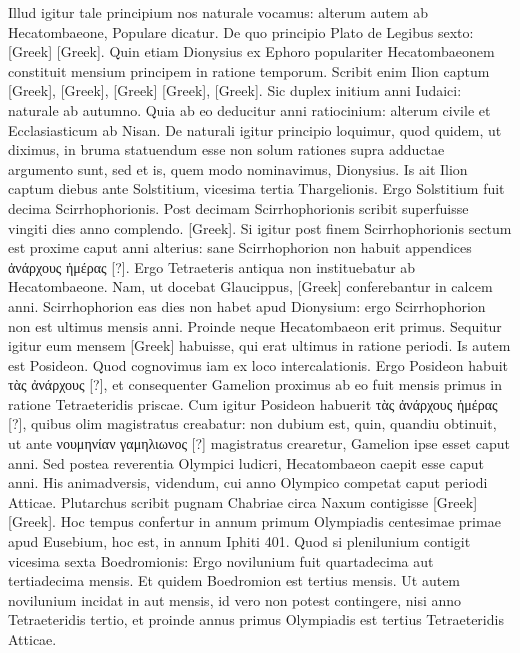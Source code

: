 Illud igitur tale principium nos naturale vocamus:
alterum autem ab Hecatombaeone, Populare dicatur.
De quo
principio Plato de Legibus sexto: \textgreek{[Greek]}
\textgreek{[Greek]}.
Quin etiam Dionysius ex Ephoro
populariter Hecatombaeonem constituit mensium principem in ratione
temporum.
Scribit enim Ilion captum \textgreek{[Greek]},
\textgreek{[Greek]}, \textgreek{[Greek]}
\textgreek{[Greek]}, \textgreek{[Greek]}.
Sic duplex initium anni
Iudaici: naturale ab autumno.
Quia ab eo deducitur anni ratiocinium:
alterum civile et Ecclasiasticum ab Nisan.
De naturali igitur
principio loquimur, quod quidem, ut diximus, in bruma statuendum
esse non solum rationes supra adductae argumento sunt, sed et is, quem
modo nominavimus, Dionysius.
Is ait Ilion captum  diebus
ante Solstitium, vicesima tertia Thargelionis.
Ergo Solstitium fuit
decima Scirrhophorionis.
Post decimam Scirrhophorionis scribit superfuisse
vingiti dies anno complendo.
\textgreek{[Greek]}.
Si igitur post finem
Scirrhophorionis sectum est proxime caput anni alterius: sane Scirrhophorion
non habuit appendices \textgreek{ἀνάρχους ἡμέρας [?]}.
Ergo Tetraeteris
antiqua non instituebatur ab Hecatombaeone.
Nam, ut docebat
Glaucippus, \textgreek{[Greek]} conferebantur in calcem anni.
Scirrhophorion
eas dies non habet apud Dionysium: ergo Scirrhophorion
non est ultimus mensis anni.
Proinde neque Hecatombaeon erit primus.
Sequitur igitur eum mensem \textgreek{[Greek]} habuisse, qui
erat ultimus in ratione periodi.
Is autem est Posideon.
Quod cognovimus
iam ex loco intercalationis.
Ergo Posideon habuit \textgreek{τὰς ἀνάρχους [?]}, et
consequenter Gamelion proximus ab eo fuit mensis primus in ratione
Tetraeteridis priscae.
Cum igitur Posideon habuerit \textgreek{τὰς ἀνάρχους ἡμέρας [?]},
quibus olim magistratus creabatur: non dubium est, quin, quandiu
obtinuit, ut ante \textgreek{νουμηνίαν γαμηλιωνος [?]} magistratus crearetur,
Gamelion ipse esset caput anni.
Sed postea reverentia Olympici ludicri,
Hecatombaeon caepit esse caput anni.
His animadversis, videndum,
cui anno Olympico competat caput periodi Atticae.
Plutarchus scribit
pugnam Chabriae circa Naxum contigisse \textgreek{[Greek]}
\textgreek{[Greek]}.
Hoc tempus confertur in annum primum
Olympiadis centesimae primae apud Eusebium, hoc est, in annum
Iphiti 401.
Quod si plenilunium contigit vicesima sexta Boedromionis:
Ergo novilunium fuit quartadecima aut tertiadecima mensis.
Et quidem Boedromion est tertius mensis.
Ut autem novilunium incidat in
 aut  mensis, id vero non potest contingere,
 nisi anno Tetraeteridis
tertio, et proinde annus primus Olympiadis est tertius Tetraeteridis
Atticae.

